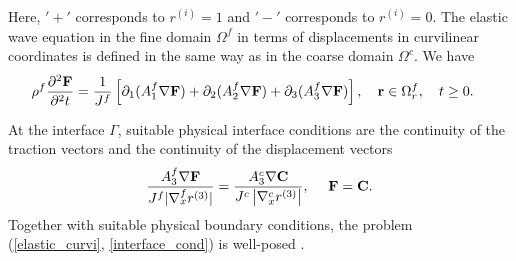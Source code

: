 Here, $'+'$ corresponds to $r^{(i)} = 1$ and $'-'$ corresponds to $r^{(i)} = 0$. The elastic wave equation in the fine domain $\Omega^f$ in terms of displacements in curvilinear coordinates is defined in the same way as in the  coarse domain $\Omega^c$. We have 
\begin{align}\label{elastic_curvi_f}
	\rho^f\frac{\partial^2{\bf F}}{\partial^2 t} &= \frac{1}{J^f}\left[\partial_1(A_1^f\nabla{\bf F}) + \partial_2(A_2^f\nabla{\bf F}) +\partial_3(A_3^f\nabla{\bf F}) \right], \ \ \  {\bf r}\in\Omega^f_r,\ \ \  t\geq0.
\end{align}


At the interface $\Gamma$, suitable physical interface conditions are the continuity of the traction vectors and the continuity of the displacement vectors 
\begin{equation}\label{interface_cond}
\frac{A_3^f\nabla{\bf F}}{J^f|\nabla_x^f r^{(3)}|}  = \frac{A_3^c\nabla{\bf C}}{J^c\left|\nabla_x^c r^{(3)}\right|}, \ \ \ \ {\bf F} = {\bf C}.
\end{equation}
Together with suitable physical boundary conditions, the problem (\ref{elastic_curvi}, \ref{interface_cond}) is well-posed \cite{duru2014stable, petersson2015wave}.



